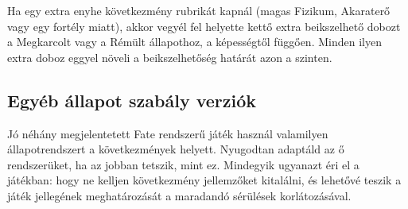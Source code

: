 Ha egy extra enyhe következmény rubrikát kapnál (magas Fizikum, Akaraterő vagy egy fortély miatt), akkor vegyél fel helyette kettő extra beikszelhető dobozt a Megkarcolt vagy a Rémült állapothoz, a képességtől függően. Minden ilyen extra doboz eggyel növeli a beikszelhetőség határát azon a szinten.

\subsection{Egyéb állapot szabály verziók}

Jó néhány megjelentetett Fate rendszerű játék használ valamilyen állapotrendszert a következmények helyett. Nyugodtan adaptáld az ő rendszerüket, ha az jobban tetszik, mint ez. Mindegyik ugyanazt éri el a játékban: hogy ne kelljen következmény jellemzőket kitalálni, és lehetővé teszik a játék jellegének meghatározását a maradandó sérülések korlátozásával.
